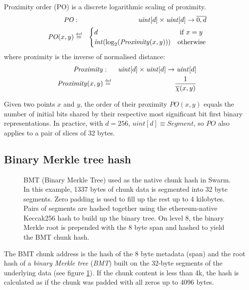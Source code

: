 \begin{definition}
\label{def:xorPO}
Proximity order (PO) is a discrete logarithmic scaling of proximity.
%
\begin{eqnarray}
\mathit{PO}&:& \mathit{uint}[d] \times\mathit{uint}[d]\to \overline{0,d}\\
\mathit{PO}(x,y) &\overset{\textrm{\tiny def}}{=} &
\begin{cases}
d & \text{ if } x=y\\
\mathit{int}(\log_2(\mathit{Proximity}(x, y)))&\text{otherwise}\\
\end{cases}
\end{eqnarray}
%
where proximity is the inverse of normalised distance:
%
\begin{eqnarray}
\mathit{Proximity}&:& \mathit{uint}[d] \times\mathit{uint}[d]\to \mathit{uint}[d]\\
\mathit{Proximity}(x, y) &\overset{\textrm{\tiny def}}{=} & \frac{1}{\overline{\chi}(x,y)}
\end{eqnarray}

Given two points $x$ and $y$,  the order of their proximity $\mathit{PO}(x,y)$ equals the number of initial bits shared by their respective most significant bit first binary representations. In practice, with $d=256$,  $\mathit{uint}[d]\equiv\mathit{Segment}$, so $\mathit{PO}$ also applies to a pair of  slices of 32 bytes.
\end{definition}


\subsection{Binary Merkle tree hash}

\begin{figure}[!ht]
   \centering
   \resizebox{.85\textwidth}{!}{
   }
   \caption[BMT: Binary Merkle Tree hash]{BMT (Binary Merkle Tree) used as the native chunk hash in Swarm. In this example, 1337 bytes of chunk data is segmented into 32 byte segments. Zero padding is used to fill up the rest up to 4 kilobytes. Pairs of segments are hashed together using the ethereum-native Keccak256 hash to build up the binary tree. On level 8, the binary Merkle root is prepended with the 8 byte span and hashed to yield the BMT chunk hash.}
   \label{fig:BMT}
\end{figure}

The BMT chunk address is the hash of the 8 byte metadata (span) and the root hash of a \emph{binary Merkle tree} (\emph{BMT}) built on the 32-byte segments of the underlying data (see figure \ref{fig:BMT}). If the chunk content is less than 4k, the hash is calculated as if the chunk was padded with all zeros up to 4096 bytes.


